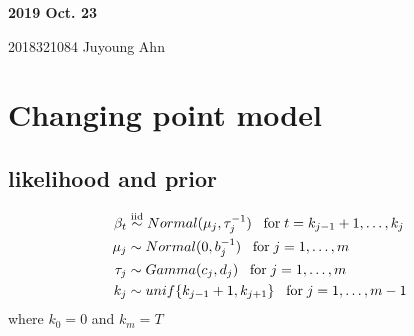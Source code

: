 \documentclass[11pt]{article}
\begin{document}
	
	
	
	\newcommand{\Ito}{$It\hat{o}$'$s~Lemma$}
	
	\newcommand\ind{\stackrel{\rm ind}{\sim}}
	\newcommand\iid{\stackrel{\rm iid}{\sim}}
	\renewcommand\c{\mathbf{c}}
	\newcommand\y{\mathbf{y}}
	\newcommand\z{\mathbf{z}}
	\renewcommand\P{\mathbf{P}}
	\newcommand\W{\mathbf{W}}
	\newcommand\X{\mathbf{X}}
	\newcommand\Y{\mathbf{Y}}
	\newcommand\Z{\mathbf{Z}}
	\newcommand\J{{\cal J}}
	\newcommand\B{{\cal B}}
	\newcommand\K{{\cal K}}
	\newcommand\N{{\rm N}}
	\newcommand\bs{\boldsymbol}
	\newcommand\bth{\bs\theta}
	\newcommand\bbe{\bs\beta}
	\renewcommand\*{^\star}
	\newcommand{\notimplies}{%
		\mathrel{{\ooalign{\hidewidth$\not\phantom{=}$\hidewidth\cr$\implies$}}}}
	
	\def\spacingset#1{\renewcommand{\baselinestretch}%
		{#1}\small\normalsize} \spacingset{1}
	
	
	
	\bigskip
	\bigskip
	\bigskip
	\begin{center}
		{\LARGE\bf 2019 Oct. 23 }
	\end{center}
	\begin{center}
		2018321084 Juyoung Ahn
	\end{center}
	\medskip
	
	
	
	\spacingset{1.45}
	\section{Changing point model}
	\subsection{likelihood and prior}
	\begin{align*}
	\beta_t &\iid 
	Normal(\mu_j,\tau_j^{-1})\;\;\; \text{for}\; t=k_{j-1} + 1, \dots ,k_j \\
	\mu_j &\sim Normal(0,b_j^{-1}) \;\;\;\text{for}\;j =  1, \dots, m \\
	\tau_j &\sim Gamma(c_j,d_j) \;\;\;\text{for}\;j =  1, \dots, m\\
	k_j &\sim unif\{k_{j-1} + 1, k_{j+1}\} \;\;\;\text{for}\;j =  1, \dots, m-1 
	\end{align*}
	where $k_0 = 0$ and $k_m = T$
\end{document}
